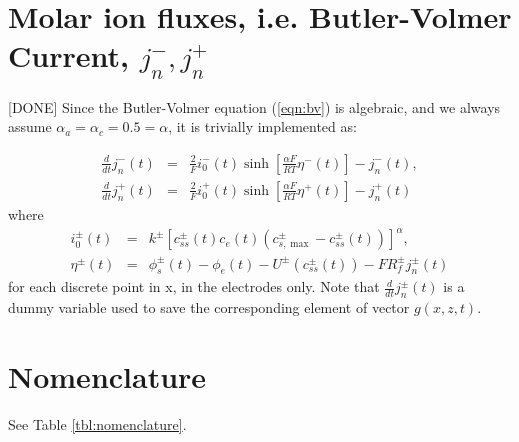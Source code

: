 \documentclass[12pt]{article}
\newcommand{\green}[1]{{\color{green}#1}}
\begin{document}
\section{Molar ion fluxes, i.e. Butler-Volmer Current, $j_{n}^{-}, j_{n}^{+}$}\label{sec:jn}
\green{[DONE]} Since the Butler-Volmer equation (\ref{eqn:bv}) is algebraic, and we always assume $\alpha_{a} = \alpha_{c} = 0.5 = \alpha$, it is trivially implemented as:

\begin{eqnarray}
	\frac{d}{dt} j_{n}^{-}(t) &=& \frac{2}{F} i_{0}^{-}(t) \sinh \left[ \frac{\alpha F}{RT} \eta^{-}(t) \right] - j_{n}^{-}(t), \\
	\frac{d}{dt} j_{n}^{+}(t) &=& \frac{2}{F} i_{0}^{+}(t) \sinh \left[ \frac{\alpha F}{RT} \eta^{+}(t) \right] - j_{n}^{+}(t)
\end{eqnarray}
where
\begin{eqnarray}
	i_{0}^{\pm}(t) &=& k^{\pm}  \left[ c_{ss}^{\pm}(t) c_{e}(t) \left(c_{s,\max}^{\pm} - c_{ss}^{\pm}(t)  \right) \right]^{\alpha}, \label{eqn:i0} \\
	\eta^{\pm}(t) &=& \phi_{s}^{\pm}(t) - \phi_{e}(t) - U^{\pm}(c_{ss}^{\pm}(t)) - F R_{f}^{\pm} j_{n}^{\pm}(t)
\end{eqnarray}
for each discrete point in x, in the electrodes only. Note that $\frac{d}{dt} j_{n}^{\pm}(t)$ is a dummy variable used to save the corresponding element of vector $g(x,z,t)$.

\section{Nomenclature}
See Table \ref{tbl:nomenclature}.
\end{document}
